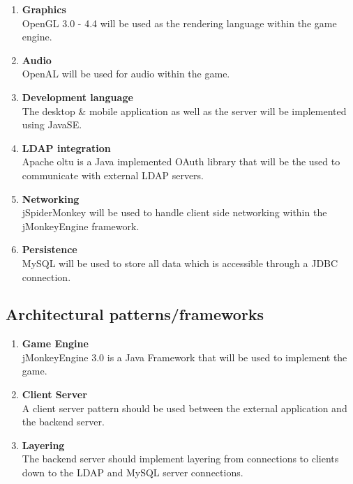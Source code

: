 \documentclass[letterpaper]{article}
\begin{document}
				\begin{enumerate}					
					\item \textbf{Graphics}
					\\OpenGL 3.0 - 4.4 will be used as the rendering language within the game engine.
					
					\item \textbf{Audio}
					\\OpenAL will be used for audio within the game.
					
					\item \textbf{Development language}
					\\The desktop \& mobile application as well as the server will be implemented using JavaSE.
					
					\item \textbf{LDAP integration}
					\\Apache oltu is a Java implemented OAuth library that will be the used to communicate with external LDAP servers.
					
					\item \textbf{Networking}
					\\jSpiderMonkey will be used to handle client side networking within the jMonkeyEngine framework.
					
					\item \textbf{Persistence}
					\\MySQL will be used to store all data which is accessible through a JDBC connection.
				\end{enumerate}
				
			\subsection*{Architectural patterns/frameworks}
			\vspace{0.1in}
			
				\begin{enumerate}
					\item \textbf{Game Engine}
					\\jMonkeyEngine 3.0 is a Java Framework that will be used to implement the game.
					
					\item \textbf{Client Server}
					\\A client server pattern should be used between the external application and the backend server.
					
					\item \textbf{Layering}
					\\The backend server should implement layering from connections to clients down to the LDAP and MySQL server connections.
				\end{enumerate}
			
		\vspace{0.2in}
		
\end{document}
